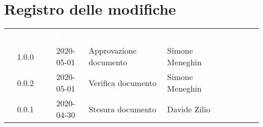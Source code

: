 \section*{Registro delle modifiche}
{
	\centering
	\begin{longtable}{ c c C{4cm}  C{4cm}  C{3cm} }
		\textcolor{white}{\textbf{Versione}} & \textcolor{white}{\textbf{Data}} & \textcolor{white}{\textbf{Descrizione}} & \textcolor{white}{\textbf{Nominativo}} & \textcolor{white}{\textbf{Ruolo}}\\		
		1.0.0 & 2020-05-01 & Approvazione documento & Simone Meneghin &\RdP{}\\		
		0.0.2 & 2020-05-01 & Verifica documento & Simone Meneghin &\ver{}\\		
		0.0.1 & 2020-04-30 & Stesura documento & Davide Zilio &\reda{}\\		
		
	\end{longtable}

}